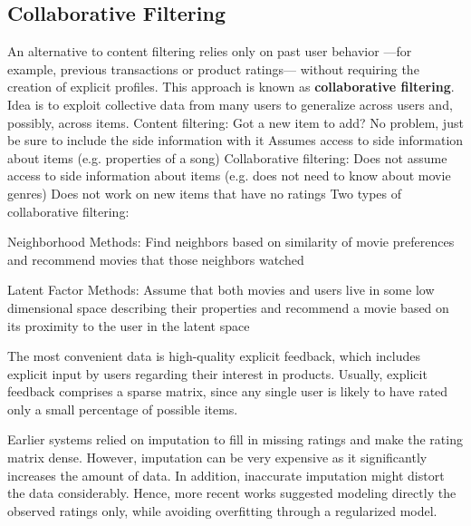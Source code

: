 \documentclass[12pt]{article}
\begin{document}
\subsection{Collaborative Filtering}
\par An alternative to content filtering relies only on past user behavior —for example, previous transactions or product ratings— without requiring the creation of explicit profiles. This approach is known as \textbf{collaborative filtering}. Idea is to exploit collective data from many users to generalize across users and, possibly, across items.
Content filtering:
\ulb
\pro Got a new item to 	add? No problem, just be sure to include the side information with it
\con Assumes access to side information about items (e.g. properties of a song)
\ule
Collaborative filtering:
\ulb
\pro  Does not assume access to side information about items (e.g. does not need to know about movie genres)
\con Does not work on new items that have no ratings
\ule
\mce
Two types of collaborative filtering:
\ulb
\item Neighborhood Methods: Find neighbors based on similarity of movie preferences and recommend movies that those neighbors watched
\item Latent Factor Methods: Assume that both movies and users live in some low dimensional space describing their properties and recommend a movie based on its proximity to the user in the latent space
\ule
\par The most convenient data is high-quality explicit feedback, which includes explicit input by users regarding their interest in products. Usually, explicit feedback comprises a sparse matrix, since any single user is likely to have rated only a small percentage of possible items.
\par Earlier systems relied on imputation to fill in missing ratings and make the rating matrix dense. However, imputation can be very expensive as it significantly increases the amount of data. In addition, inaccurate imputation might distort the data considerably. Hence, more recent works suggested modeling directly the observed ratings only, while avoiding overfitting through a regularized model.
\end{document}

